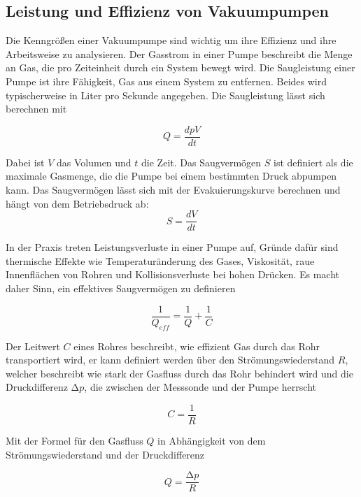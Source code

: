 \subsection{Leistung und Effizienz von Vakuumpumpen}


Die Kenngrößen einer Vakuumpumpe sind wichtig um ihre Effizienz und ihre Arbeitsweise zu analysieren.
Der Gasstrom in einer Pumpe beschreibt die Menge an Gas, die pro Zeiteinheit durch ein System bewegt wird. Die Saugleistung einer Pumpe ist ihre 
Fähigkeit, Gas aus einem System zu entfernen. Beides wird typischerweise in Liter pro Sekunde angegeben. Die Saugleistung lässt sich berechnen mit

\begin{equation}
    Q=\frac{dpV}{dt}
\end{equation}

Dabei ist \( V \) das Volumen und \( t \) die Zeit.
Das Saugvermögen $S$ ist definiert als die maximale Gasmenge, die die Pumpe bei einem bestimmten Druck abpumpen kann. Das Saugvermögen lässt sich 
mit der Evakuierungskurve berechnen und hängt von dem Betriebsdruck ab:
\begin{equation}
    S=\frac{dV}{dt}
\end{equation} 

In der Praxis treten Leistungsverluste in einer Pumpe auf, Gründe dafür sind thermische Effekte wie Temperaturänderung des Gases,
Viskosität, raue Innenflächen von Rohren und Kollisionsverluste bei hohen Drücken. Es macht daher Sinn, ein effektives Saugvermögen zu definieren

\begin{equation}
    \frac{1}{Q_{eff}}=\frac{1}{Q}+\frac{1}{C}
\end{equation}   

Der Leitwert \( C \) eines Rohres beschreibt, wie effizient Gas durch das Rohr transportiert wird, er kann definiert werden über 
den Strömungswiederstand \( R \), welcher beschreibt wie stark der Gasfluss durch das Rohr behindert wird 
und die Druckdifferenz \(\increment p\), die zwischen der Messsonde und der Pumpe herrscht

\begin{equation}
    C=\frac{1}{R}
\end{equation}

Mit der Formel für den Gasfluss \( Q \) in Abhängigkeit von dem Strömungswiederstand und der Druckdifferenz

\begin{equation}
    Q=\frac{\increment p}{R}
\end{equation}


